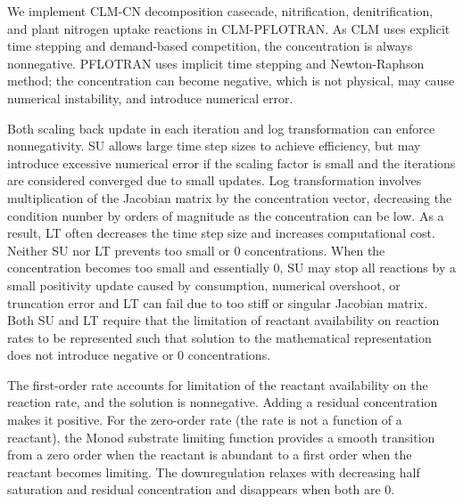 \documentclass[gmd, manuscript]{copernicus}
\begin{document}
  

%

We implement CLM-CN decomposition casecade,
nitrification, denitrification, and plant nitrogen uptake reactions in CLM-PFLOTRAN. As
CLM uses explicit time stepping and demand-based
competition, the concentration is always nonnegative. PFLOTRAN uses implicit
time stepping and Newton-Raphson method; the
concentration can become negative, which is not physical, may cause numerical
instability, and introduce numerical error. 

Both scaling back update in each iteration and log transformation can enforce
nonnegativity. SU allows large time step sizes to achieve efficiency, but may
introduce excessive numerical error if the scaling factor is small and the
iterations are considered converged due to small updates. Log transformation
involves multiplication of the Jacobian matrix by the concentration vector,
decreasing the condition number by orders of magnitude as the concentration can
be low. As a result, LT often decreases the time step size and increases
computational cost. Neither SU nor LT prevents too small or 0 concentrations.
When the concentration becomes too small and essentially 0, SU may stop all
reactions by a small positivity update caused by consumption, numerical
overshoot, or truncation error and LT can fail due to too stiff or singular
Jacobian matrix. Both SU and LT require that the limitation of reactant
availability on reaction rates to be represented such that solution to the
mathematical representation does not introduce negative or 0 concentrations.

The first-order rate accounts for
limitation of the reactant availability on the reaction rate, and the solution
is nonnegative. Adding a residual concentration makes it positive. For the
zero-order rate (the rate is not a function of a reactant), the Monod
substrate limiting function provides a smooth transition from a zero order when
the reactant is abundant to a first order when the reactant becomes
limiting. The downregulation relaxes with decreasing half saturation and
residual concentration and disappears when both are 0.
\end{document}
